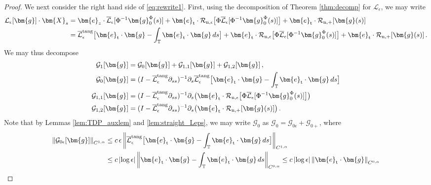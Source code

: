 \documentclass[11pt,reqno]{amsart}
\newcommand{\T}{\mathbb{T}}
\newcommand{\X}{\bm{X}}
\newcommand{\be}{\bm{e}}
\newcommand{\p}{\partial}
\newcommand{\abs}[1]{\left\lvert #1 \right\rvert}
\newcommand{\norm}[1]{\left\lVert #1 \right\rVert}
\newcommand{\mc}[1]{\mathcal{#1}}
\theoremstyle{definition}
\begin{document}
\begin{proof}
We next consider the right hand side of \eqref{eq:rewrite1}. First, using the decomposition of Theorem \ref{thm:decomp} for $\mc{L}_\epsilon$, we may write 
\begin{equation}
\begin{aligned}
  \mc{L}_\epsilon[\bm{g}]\cdot\X_s &= \be_z\cdot\overline{\mc{L}}_\epsilon[\Phi^{-1}\bm{g}_0^\Phi(s)]  + \be_{\rm t}\cdot\mc{R}_{\rm n,\epsilon}\big[\Phi\overline{\mc{L}}_\epsilon[\Phi^{-1}\bm{g}_0^\Phi(s)]\big] +\be_{\rm t}\cdot\mc{R}_{\rm n,+}[\bm{g}(s)]\\
  &= \overline{\mc{L}}_\epsilon^{\rm tang}\big[\be_{\rm t}\cdot\bm{g}-\int_{\T}\be_{\rm t}\cdot\bm{g}\,ds \big] + \be_{\rm t}\cdot\mc{R}_{\rm n,\epsilon}\big[\Phi\overline{\mc{L}}_\epsilon[\Phi^{-1}\bm{g}_0^\Phi(s)]\big] +\be_{\rm t}\cdot\mc{R}_{\rm n,+}[\bm{g}(s)]\,.
\end{aligned}
\end{equation}
%
%
We may thus decompose
\begin{equation}
\begin{aligned}
  \mc{G}_1[\bm{g}] &= \mc{G}_0[\bm{g}] + \mc{G}_{1,1}[\bm{g}] +\mc{G}_{1,2}[\bm{g}]\,,\\
  \mc{G}_0[\bm{g}] &=(I- \overline{\mc{L}}_\epsilon^{\rm tang}\p_{ss})^{-1}\p_s\overline{\mc{L}}_\epsilon^{\rm tang}\big[\be_{\rm t}\cdot\bm{g}-\int_{\T}\be_{\rm t}\cdot\bm{g}\,ds \big] \\
  \mc{G}_{1,1}[\bm{g}] &= (I- \overline{\mc{L}}_\epsilon^{\rm tang}\p_{ss})^{-1}\p_s\big(\be_{\rm t}\cdot\mc{R}_{\rm n,\epsilon}\big[\Phi\overline{\mc{L}}_\epsilon[\Phi^{-1}\bm{g}_0^\Phi(s)]\big]\big)\\
  \mc{G}_{1,2}[\bm{g}] &= (I- \overline{\mc{L}}_\epsilon^{\rm tang}\p_{ss})^{-1}\p_s\big(\be_{\rm t}\cdot\mc{R}_{\rm n,+}[\bm{g}(s)] \big)\,.
\end{aligned}
\end{equation}
%
%
Note that by Lemmas \ref{lem:TDP_auxlem} and \ref{lem:straight_Leps}, we may write $\mc{G}_0$ as $\mc{G}_0=\mc{G}_{0\epsilon}+\mc{G}_{0+}$, where
\begin{equation}\label{eq:G0ests}
\begin{aligned}
  \norm{\mc{G}_{0\epsilon}[\bm{g}]}_{C^{1,\alpha}} &\le c\,\epsilon\norm{\overline{\mc{L}}_\epsilon^{\rm tang}\big[\be_{\rm t}\cdot\bm{g}-\int_{\T}\be_{\rm t}\cdot\bm{g}\,ds\big]}_{C^{1,\alpha}}\\
  &\le c\abs{\log\epsilon}\norm{\be_{\rm t}\cdot\bm{g}-\int_{\T}\be_{\rm t}\cdot\bm{g}\,ds}_{C^{0,\alpha}} 
  \le c\abs{\log\epsilon}\norm{\be_{\rm t}\cdot\bm{g}}_{C^{0,\alpha}} \\

\end{aligned}
\end{equation}
\end{proof}
\end{document}
